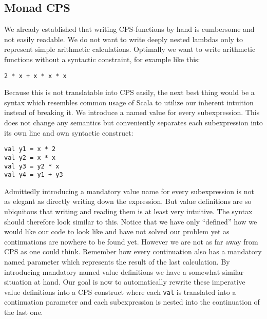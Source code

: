 \subsection{Monad CPS} \label{sec:monadCPS}

We already established that writing CPS-functions by hand is cumbersome and not easily readable. We do not want to write deeply nested lambdas only to represent simple arithmetic calculations. Optimally we want to write arithmetic functions without a syntactic constraint, for example like this:
\begin{lstlisting}
2 * x + x * x * x
\end{lstlisting}
Because this is not translatable into CPS easily, the next best thing would be a syntax which resembles common usage of Scala to utilize our inherent intuition instead of breaking it. We introduce a named value for every subexpression. This does not change any semantics but conveniently separates each subexpression into its own line and own syntactic construct:
\begin{lstlisting}
val y1 = x * 2
val y2 = x * x
val y3 = y2 * x
val y4 = y1 + y3
\end{lstlisting}
Admittedly introducing a mandatory value name for every subexpression is not as elegant as directly writing down the expression. But value definitions are so ubiquitous that writing and reading them is at least very intuitive. The syntax should therefore look similar to this. Notice that we have only ``defined'' how we would like our code to look like and have not solved our problem yet as continuations are nowhere to be found yet. However we are not as far away from CPS as one could think. Remember how every continuation also has a mandatory named parameter which represents the result of the last calculation. By introducing mandatory named value definitions we have a somewhat similar situation at hand. Our goal is now to automatically rewrite these imperative value definitions into a CPS construct where each \lstinline{val} is translated into a continuation parameter and each subexpression is nested into the continuation of the last one.

